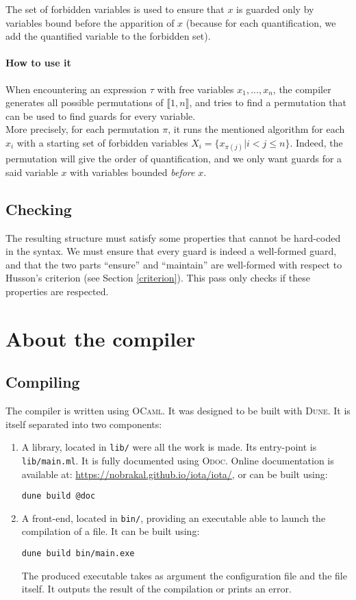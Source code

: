 \documentclass[10pt,a4paper]{article}
\newcommand\Odoc{\textsc{Odoc}}
\newcommand\Ocaml{\textsc{OCaml}}
\newcommand\Dune{\textsc{Dune}}
\begin{document}
The set of forbidden variables is used to ensure that $x$ is guarded only by variables bound before the apparition of $x$ (because for each quantification, we add the quantified variable to the forbidden set).

\paragraph{How to use it}
When encountering an expression $\tau$ with free variables $x_1,...,x_n$, the compiler generates all possible permutations of $\llbracket 1,n \rrbracket$, and tries to find a permutation that can be used to find guards for every variable.\\
More precisely, for each permutation $\pi$, it runs the mentioned algorithm for each $x_i$ with a starting set of forbidden variables $X_i = \{x_{\pi(j)} | i<j\le n\}$. Indeed, the permutation will give the order of quantification, and we only want guards for a said variable $x$ with variables bounded \emph{before} $x$.

\subsection{Checking}
\label{subsec:verification}
The resulting structure must satisfy some properties that cannot be hard-coded in the syntax. We must ensure that every guard is indeed a well-formed guard, and that the two parts ``ensure'' and ``maintain'' are well-formed with respect to Husson's criterion (see Section \ref{criterion}). This pass only checks if these properties are respected.

\section{About the compiler}
\subsection{Compiling}
The compiler is written using \Ocaml{}\cite{ocaml}. It was designed to be built with \Dune{}\cite{dune}. It is itself separated into two components:

\begin{enumerate}
\item A library, located in \verb|lib/| were all the work is made. Its entry-point is \verb|lib/main.ml|. It is fully documented using \Odoc{}\cite{odoc}. Online documentation is available at: \url{https://nobrakal.github.io/iota/iota/}, or can be built using:
\begin{verbatim}
dune build @doc
\end{verbatim}
\item A front-end, located in \verb|bin/|, providing an executable able to launch the compilation of a file. It can be built using:
\begin{verbatim}
dune build bin/main.exe
\end{verbatim}
  The produced executable takes as argument the configuration file and the file itself. It outputs the result of the compilation or prints an error.
\end{enumerate}
\end{document}
